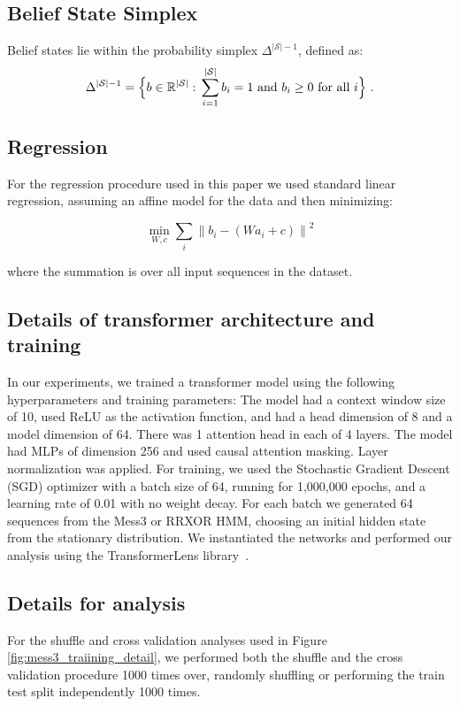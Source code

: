\documentclass{article}
\begin{document}
\subsection{Belief State Simplex}
Belief states
lie within the probability simplex \( \Delta^{|\mathcal{S}|-1} \), defined as:
\[
\Delta^{|\mathcal{S}|-1} = \Bigl\{ b \in \mathbb{R}^{|\mathcal{S}|} : \, \sum_{i=1}^{|\mathcal{S}|} b_i = 1 \text{ and } b_i \geq 0 \text{ for all } i \Bigr\}~.
\]

\subsection{Regression}
For the regression procedure used in this paper we used standard linear regression, assuming an affine model for the data and then minimizing:

\[
\min_{W, c} \sum_{i} \left\| b_i - (W a_i + c) \right\|^2
\]

where the summation is over all input sequences in the dataset.

\subsection{Details of transformer architecture and training}
In our experiments, we trained a transformer model using the following hyperparameters and training parameters: The model had a context window size of 10, used ReLU as the activation function, and had a head dimension of 8 and a model dimension of 64. There was 1 attention head in each of 4 layers. The model had MLPs of dimension 256 and used causal attention masking. Layer normalization was applied. For training, we used the Stochastic Gradient Descent (SGD) optimizer with a batch size of 64, running for 1,000,000 epochs, and a learning rate of 0.01 with no weight decay. For each batch we generated 64 sequences from the Mess3 or RRXOR HMM, choosing an initial hidden state from the stationary distribution. We instantiated the networks and performed our analysis using the TransformerLens library~\cite{Nanda2022_Transformerlens}.

\subsection{Details for analysis}
For the shuffle and cross validation analyses used in Figure \ref{fig:mess3_traiining_detail}, we performed both the shuffle and the cross validation procedure 1000 times over, randomly shuffling or performing the train test split independently 1000 times.
\end{document}
